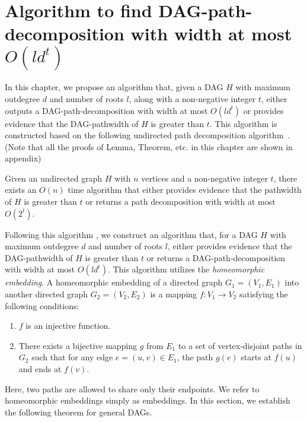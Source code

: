 \documentclass[runningheads]{llncs}
\theoremstyle{plain}
\theoremstyle{definition}
\begin{document}
\section{Algorithm to find DAG-path-decomposition with width at most $O(ld^t)$}\label{chapter5}

In this chapter, we propose an algorithm that, given a DAG $H$ with maximum outdegree $d$ and number of roots $l$, along with a non-negative integer $t$, either outputs a DAG-path-decomposition with width at most $O(ld^t)$ or provides evidence that the DAG-pathwidth of $H$ is greater than $t$. 
This algorithm is constructed based on the following undirected path decomposition algorithm~\cite{art8}. (Note that all the proofs of Lemma, Theorem, etc. in this chapter are shown in appendix)

\begin{proposition}\label{pathwidth algorithm of undirected graph}
    Given an undirected graph $H$ with $n$ vertices and a non-negative integer $t$, there exists an $O(n)$ time algorithm that either provides evidence that the pathwidth of $H$ is greater than $t$ or returns a path decomposition with width at most $O(2^t)$.
\end{proposition}

Following this algorithm \cite{art8}, we construct an algorithm that, for a DAG $H$ with maximum outdegree $d$ and number of roots $l$, either provides evidence that the DAG-pathwidth of $H$ is greater than $t$ or returns a DAG-path-decomposition with width at most $O(ld^t)$. This algorithm utilizes the \emph{homeomorphic embedding}. A homeomorphic embedding of a directed graph $G_1 = (V_1, E_1)$ into another directed graph $G_2 = (V_2, E_2)$ is a mapping $f: V_1 \rightarrow V_2$ satisfying the following conditions:
\begin{enumerate}
    \item $f$ is an injective function.
    \item There exists a bijective mapping $g$ from $E_1$ to a set of vertex-disjoint paths in $G_2$ such that for any edge $e = (u, v) \in E_1$, the path $g(e)$ starts at $f(u)$ and ends at $f(v)$.
\end{enumerate}
Here, two paths are allowed to share only their endpoints. We refer to homeomorphic embeddings simply as embeddings. In this section, we establish the following theorem for general DAGs.
\end{document}
